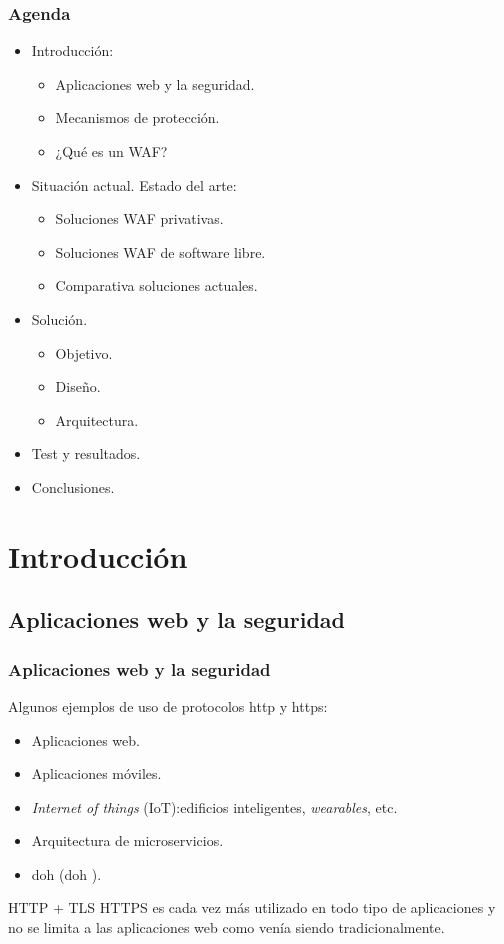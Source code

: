 \begin{frame}[shrink=20]
  \frametitle{Agenda}
  \begin{itemize}
    \item Introducción:
      \begin{itemize}
        \item Aplicaciones web y la seguridad.
        \item Mecanismos de protección.
        \item ¿Qué es un WAF?
      \end{itemize}
    \item Situación actual. Estado del arte:
      \begin{itemize}
        \item Soluciones WAF privativas.
        \item Soluciones WAF de software libre.
        \item Comparativa soluciones actuales.
      \end{itemize}
    \item Solución.
      \begin{itemize}
        \item Objetivo.
        \item Diseño.
        \item Arquitectura.
      \end{itemize}
    \item Test y resultados.
    \item Conclusiones.
  \end{itemize}
\end{frame}

\section{Introducción}
\subsection{Aplicaciones web y la seguridad}
\begin{frame}[shrink=20]
  \frametitle{Aplicaciones web y la seguridad}
  Algunos ejemplos de uso de protocolos \acrshort{http} y \acrshort{https}:
  \begin{itemize}
    \item Aplicaciones web.
    \item Aplicaciones móviles.
    \item {\em Internet of things} (IoT):edificios inteligentes, {\em wearables}, etc.
    \item Arquitectura de microservicios.
    \item \acrlong{doh} (\acrshort{doh} \cite{doh}).
  \end{itemize}
  \begin{block}{HTTP + TLS}
    HTTPS es cada vez más utilizado en todo tipo de aplicaciones y no se limita a las aplicaciones web como venía siendo tradicionalmente.
  \end{block}
\end{frame}

